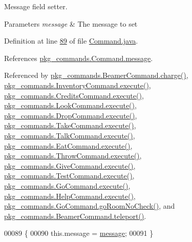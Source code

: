 Message field setter. 


\begin{DoxyParams}{Parameters}
{\em message} & The message to set \\
\hline
\end{DoxyParams}


Definition at line \hyperlink{Command_8java_source_l00089}{89} of file \hyperlink{Command_8java_source}{Command.\-java}.



References \hyperlink{Command_8java_source_l00035}{pkg\-\_\-commands.\-Command.\-message}.



Referenced by \hyperlink{BeamerCommand_8java_source_l00067}{pkg\-\_\-commands.\-Beamer\-Command.\-charge()}, \hyperlink{InventoryCommand_8java_source_l00023}{pkg\-\_\-commands.\-Inventory\-Command.\-execute()}, \hyperlink{CreditsCommand_8java_source_l00023}{pkg\-\_\-commands.\-Credits\-Command.\-execute()}, \hyperlink{LookCommand_8java_source_l00026}{pkg\-\_\-commands.\-Look\-Command.\-execute()}, \hyperlink{DropCommand_8java_source_l00027}{pkg\-\_\-commands.\-Drop\-Command.\-execute()}, \hyperlink{TakeCommand_8java_source_l00027}{pkg\-\_\-commands.\-Take\-Command.\-execute()}, \hyperlink{TalkCommand_8java_source_l00027}{pkg\-\_\-commands.\-Talk\-Command.\-execute()}, \hyperlink{EatCommand_8java_source_l00028}{pkg\-\_\-commands.\-Eat\-Command.\-execute()}, \hyperlink{ThrowCommand_8java_source_l00028}{pkg\-\_\-commands.\-Throw\-Command.\-execute()}, \hyperlink{GiveCommand_8java_source_l00029}{pkg\-\_\-commands.\-Give\-Command.\-execute()}, \hyperlink{TestCommand_8java_source_l00032}{pkg\-\_\-commands.\-Test\-Command.\-execute()}, \hyperlink{GoCommand_8java_source_l00032}{pkg\-\_\-commands.\-Go\-Command.\-execute()}, \hyperlink{HelpCommand_8java_source_l00033}{pkg\-\_\-commands.\-Help\-Command.\-execute()}, \hyperlink{GoCommand_8java_source_l00071}{pkg\-\_\-commands.\-Go\-Command.\-go\-Room\-No\-Check()}, and \hyperlink{BeamerCommand_8java_source_l00050}{pkg\-\_\-commands.\-Beamer\-Command.\-teleport()}.


\begin{DoxyCode}
00089                                               \{
00090         this.message = \hyperlink{classpkg__commands_1_1Command_ab4bc9d76fd948fcf253400793fbfde3f}{message};
00091     \}
\end{DoxyCode}


